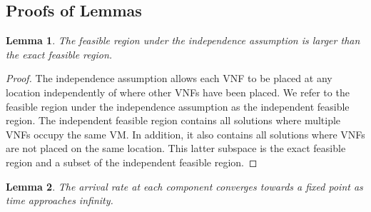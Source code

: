 \documentclass[journal]{IEEEtran}
\newtheorem{lemma}{Lemma}
\begin{document}
\subsection{Proofs of Lemmas}
\label{sec:proofs}

\begin{lemma}
The feasible region under the independence assumption is larger than the exact feasible region.
\end{lemma}

\begin{proof}
The independence assumption allows each VNF to be placed at any location independently of where other VNFs have been placed. We refer to the feasible region under the independence assumption as the independent feasible region. The independent feasible region contains all solutions where multiple VNFs occupy the same VM. In addition, it also contains all solutions where VNFs are not placed on the same location. This latter subspace is the exact feasible region and a subset of the independent feasible region.
\end{proof}



\begin{lemma}
The arrival rate at each component converges towards a fixed point as time approaches infinity.
\label{lemma:arrival_rate}
\end{lemma}
\end{document}
